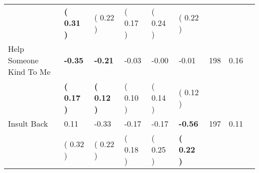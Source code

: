 \begin{tabular}{L{6.2cm} C{1.8cm} C{1.8cm} C{1.8cm} C{1.8cm} C{1.8cm} C{1.8cm} C{0.3cm} C{0.3cm}}
 & \textbf{(     0.31 )} & (     0.22 ) & (     0.17 ) & (     0.24 ) & (     0.22 )  & \\
Help Someone Kind To Me & \textbf{    -0.35} & \textbf{    -0.21} &     -0.03 &     -0.00 &     -0.01  & 198 &       0.16 \\ 
 & \textbf{(     0.17 )} & \textbf{(     0.12 )} & (     0.10 ) & (     0.14 ) & (     0.12 )  & \\
Insult Back &      0.11 &     -0.33 &     -0.17 &     -0.17 & \textbf{    -0.56}  & 197 &       0.11 \\ 
 & (     0.32 ) & (     0.22 ) & (     0.18 ) & (     0.25 ) & \textbf{(     0.22 )}  & \\
\bottomrule
\end{tabular}
